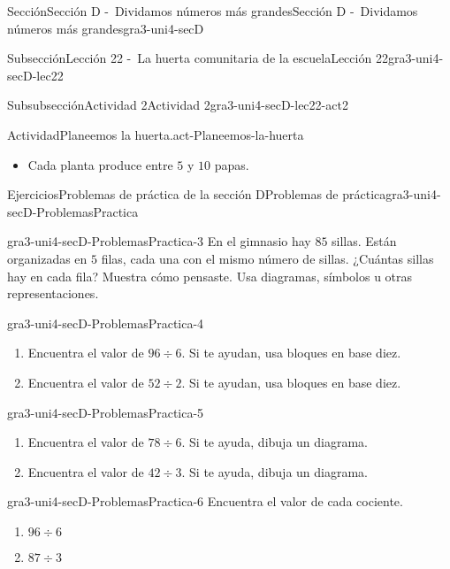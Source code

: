 \documentclass[twoside,10pt,]{article}
\begin{document}
\begin{sectionptx}{Sección}{Sección D -~Dividamos números más grandes}{}{Sección D -~Dividamos números más grandes}{}{}{gra3-uni4-secD}
\begin{subsectionptx}{Subsección}{Lección 22 -~La huerta comunitaria de la escuela}{}{Lección 22}{}{}{gra3-uni4-secD-lec22}
\begin{subsubsectionptx}{Subsubsección}{Actividad 2}{}{Actividad 2}{}{}{gra3-uni4-secD-lec22-act2}
\begin{activity}{Actividad}{Planeemos la huerta.}{act-Planeemos-la-huerta}
\begin{sidebyside}{2}{0}{0}{0}
\begin{sbspanel}{0.5}
\begin{itemize}[label=\textbullet]
\item{}Cada planta produce entre \(5\) y \(10\) papas.%
\end{itemize}
\end{sbspanel}%
\end{sidebyside}%
\end{activity}%
\end{subsubsectionptx}
\end{subsectionptx}
%
%
\typeout{************************************************}
\typeout{************************************************}
%
\begin{exercises-subsection}{Ejercicios}{Problemas de práctica de la sección D}{}{Problemas de práctica}{}{}{gra3-uni4-secD-ProblemasPractica}
\begin{divisionexercise}{1}{}{}{gra3-uni4-secD-ProblemasPractica-3}%
En el gimnasio hay \(85\) sillas. Están organizadas en \(5\) filas, cada una con el mismo número de sillas. ¿Cuántas sillas hay en cada fila? Muestra cómo pensaste. Usa diagramas, símbolos u otras representaciones.%
\end{divisionexercise}%
\begin{divisionexercise}{2}{}{}{gra3-uni4-secD-ProblemasPractica-4}%
%
\begin{enumerate}[label=(\alph*)]
\item{}Encuentra el valor de \(96 \div 6\). Si te ayudan, usa bloques en base diez.%
\item{}Encuentra el valor de \(52 \div 2\). Si te ayudan, usa bloques en base diez.%
\end{enumerate}
\end{divisionexercise}%
\begin{divisionexercise}{3}{}{}{gra3-uni4-secD-ProblemasPractica-5}%
%
\begin{enumerate}[label=(\alph*)]
\item{}Encuentra el valor de \(78 \div 6\). Si te ayuda, dibuja un diagrama.%
\item{}Encuentra el valor de \(42 \div 3\). Si te ayuda, dibuja un diagrama.%
\end{enumerate}
\end{divisionexercise}%
\begin{divisionexercise}{4}{}{}{gra3-uni4-secD-ProblemasPractica-6}%
Encuentra el valor de cada cociente.%
%
\begin{enumerate}[label=(\alph*)]
\item{}\(\displaystyle 96 \div 6\)%
\item{}\(\displaystyle 87 \div 3\)%

\end{enumerate}
\end{divisionexercise}
\end{exercises-subsection}
\end{sectionptx}
\end{document}
